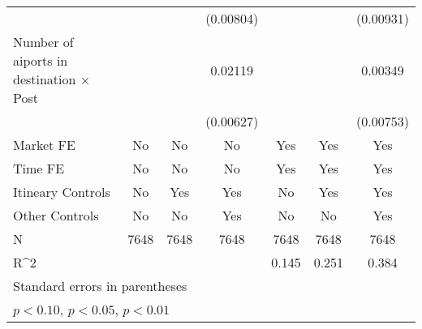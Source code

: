 \begin{table}[htbp]
\begin{tabular}{l*{6}{c}}
                    &                     &                     &   (0.00804)         &                     &                     &   (0.00931)         \\
\addlinespace
Number of aiports in destination $\times$ Post&                     &                     &     0.02119\sym{***}&                     &                     &     0.00349         \\
                    &                     &                     &   (0.00627)         &                     &                     &   (0.00753)         \\
\midrule
Market FE           &          No         &          No         &          No         &         Yes         &         Yes         &         Yes         \\
Time FE             &          No         &          No         &          No         &         Yes         &         Yes         &         Yes         \\
Itineary Controls   &          No         &         Yes         &         Yes         &          No         &         Yes         &         Yes         \\
Other Controls      &          No         &          No         &         Yes         &          No         &          No         &         Yes         \\
N                   &        7648         &        7648         &        7648         &        7648         &        7648         &        7648         \\
R^2                 &                     &                     &                     &       0.145         &       0.251         &       0.384         \\
\bottomrule
\multicolumn{7}{l}{\footnotesize Standard errors in parentheses}\\
\multicolumn{7}{l}{\footnotesize \sym{*} \(p<0.10\), \sym{**} \(p<0.05\), \sym{***} \(p<0.01\)}\\
\end{tabular}
\end{table}
